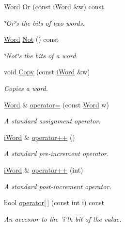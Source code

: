 \begin{DoxyCompactItemize}
\hyperlink{classWord}{Word} \hyperlink{classWord_a681da292897265ae47f144a99d49d9ec}{Or} (const \hyperlink{classiWord}{iWord} \&w) const 
\begin{DoxyCompactList}\small\item\em \char`\"{}Or\char`\"{}s the bits of two words. \item\end{DoxyCompactList}\item 
\hyperlink{classWord}{Word} \hyperlink{classWord_afdecfa9e3f2fda36496f249617a4cef5}{Not} () const 
\begin{DoxyCompactList}\small\item\em \char`\"{}Not\char`\"{}s the bits of a word. \item\end{DoxyCompactList}\item 
void \hyperlink{classWord_a8c094d866fe9af5da5d32c98430a86f8}{Copy} (const \hyperlink{classiWord}{iWord} \&w)
\begin{DoxyCompactList}\small\item\em Copies a word. \item\end{DoxyCompactList}\item 
\hyperlink{classWord}{Word} \& \hyperlink{classWord_a4cbab3635971c12fdb2bf37d2603e36e}{operator=} (const \hyperlink{classWord}{Word} w)
\begin{DoxyCompactList}\small\item\em A standard assignment operator. \item\end{DoxyCompactList}\item 
\hyperlink{classiWord}{iWord} \& \hyperlink{classWord_a8641e9e5139b8f5bfbc52ab2557d8f9a}{operator++} ()
\begin{DoxyCompactList}\small\item\em A standard pre-\/increment operator. \item\end{DoxyCompactList}\item 
\hyperlink{classiWord}{iWord} \& \hyperlink{classWord_aba1bb3e72c1262cc69d74b971d3bc7ee}{operator++} (int)
\begin{DoxyCompactList}\small\item\em A standard post-\/increment operator. \item\end{DoxyCompactList}\item 
bool \hyperlink{classWord_a0b08a81ced05b38d3d719ef70ecb3215}{operator\mbox{[}$\,$\mbox{]}} (const int i) const 
\begin{DoxyCompactList}\small\item\em An accessor to the 'i'th bit of the value. \item\end{DoxyCompactList}\end{DoxyCompactItemize}
